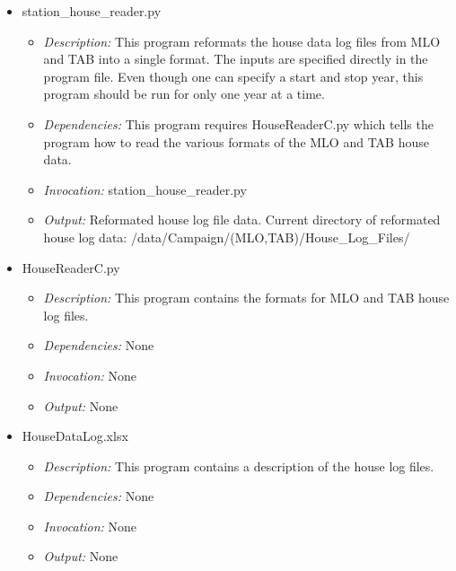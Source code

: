 \documentclass[12pt, letterpaper]{article}
\begin{document}
\begin{itemize}
\item station\_house\_reader.py
\begin{itemize}
\item \textit{Description:} This program reformats the house data log files from MLO and TAB into a single format. The inputs are specified directly in the program file. Even though one can specify a start and stop year, this program should be run for only one year at a time. 
\item \textit{Dependencies:} This program requires HouseReaderC.py which tells the program how to read the various formats of the MLO and TAB house data.
\item \textit{Invocation:} station\_house\_reader.py
\item \textit{Output:} Reformated house log file data. Current directory of reformated house log data: /data/Campaign/(MLO,TAB)/House\_Log\_Files/ 
\end{itemize}
\end{itemize}

\begin{itemize}
\item HouseReaderC.py
\begin{itemize}
\item \textit{Description:} This program contains the formats for MLO and TAB house log files.
\item \textit{Dependencies:} None
\item \textit{Invocation:} None
\item \textit{Output:} None
\end{itemize}
\end{itemize}

\begin{itemize}
\item HouseDataLog.xlsx
\begin{itemize}
\item \textit{Description:} This program contains a description of the house log files.
\item \textit{Dependencies:} None
\item \textit{Invocation:} None
\item \textit{Output:} None
\end{itemize}
\end{itemize}
\end{document}
